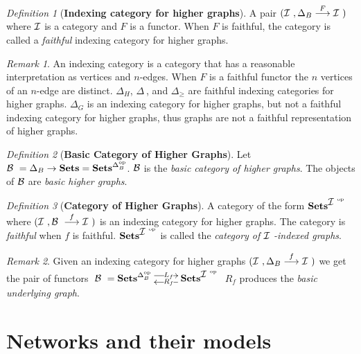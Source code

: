 \documentclass[10pt]{article}
\newcommand{\onearrow}[3]{\mbox{$#1 \stackrel{#2}{\longrightarrow} #3$}}
\newcommand{\calB}{\mbox{${\cal B}\ $}}
\newcommand{\calI}{\mbox{${\cal I}\ $}}
\theoremstyle{remark}
\newtheorem{remark}{Remark}
\newtheorem{definition}{Definition}
\begin{document}
\begin{definition}[\textbf{Indexing category for higher graphs}]
A pair $(\calI, \onearrow{\Delta_B}{F}{\calI})$ where \calI is a category and $F$ is a functor. When $F$ is faithful, the category is called a \emph{faithful} indexing category for higher graphs.
\end{definition}

\begin{remark}
An indexing category is a category that has a reasonable interpretation as vertices and $n$-edges. When $F$ is a faithful functor the $n$ vertices of an $n$-edge are distinct. $\Delta_H$, $\Delta_{\>}$, and
$\Delta_{\geq}$ are faithful indexing categories for higher graphs. $\Delta_G$ is an indexing category for higher graphs, but not a faithful indexing category for higher graphs, thus graphs are not a faithful representation of higher graphs.
\end{remark}

\begin{definition}[\textbf{Basic Category of Higher Graphs}]
Let $\calB = \Delta_B \rightarrow \mathbf{Sets} = \mathbf{Sets}^{\Delta_B^{\text{op}}}$. \calB is the \emph{basic category of higher graphs}. The objects of \calB are \emph{basic higher graphs}.
\end{definition}

\begin{definition}[\textbf{Category of Higher Graphs}]
A category of the form $\mathbf{Sets}^{{\calI}^{\text{op}}}$ where $(\calI, \onearrow{\calB}{f}{\calI})$ is an indexing category for higher graphs. The category is \emph{faithful} when $f$ is faithful. $\mathbf{Sets}^{{\calI}^{\text{op}}}$ is called the \emph{category of \calI-indexed graphs}.
\end{definition}

\begin{remark}
Given an indexing category for higher graphs $(\calI, \onearrow{\Delta_B}{f}{\calI})$ we get the pair of functors
$\xymatrix{
\calB = \mathbf{Sets}^{\Delta_B^{\text{op}}} \ar@<0.8ex>[r]|(0.6){L_f} & \mathbf{Sets}^{\calI^{\text{op}}} \ar@<0.8ex>[l]|(0.4){R_f}
}$ $R_f$ produces the \emph{basic underlying graph}.
\end{remark}


\section{Networks and their models}
\end{document}
